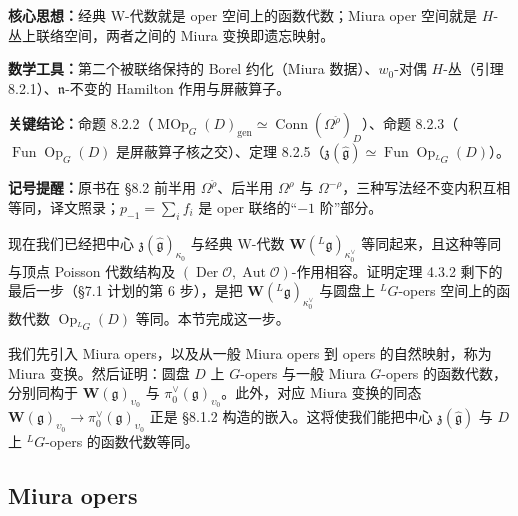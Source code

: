\begin{keypoints}
    \item \textbf{核心思想：}经典 W-代数就是 oper 空间上的函数代数；Miura oper 空间就是 $H$-丛上联络空间，两者之间的 Miura 变换即遗忘映射。
    \item \textbf{数学工具：}第二个被联络保持的 Borel 约化（Miura 数据）、$w_0$-对偶 $H$-丛（引理 8.2.1）、$\mathfrak n$-不变的 Hamilton 作用与屏蔽算子。
    \item \textbf{关键结论：}命题 8.2.2（$\operatorname{MOp}_G(D)_{\mathrm{gen}}\simeq\operatorname{Conn}(\Omega^{\check\rho})_D$）、命题 8.2.3（$\operatorname{Fun}\operatorname{Op}_G(D)$ 是屏蔽算子核之交）、定理 8.2.5（$\mathfrak z(\hat{\mathfrak g})\simeq\operatorname{Fun}\operatorname{Op}_{{}^LG}(D)$）。
    \item \textbf{记号提醒：}原书在 §8.2 前半用 $\Omega^{\check\rho}$、后半用 $\Omega^{\rho}$ 与 $\Omega^{-\rho}$，三种写法经不变内积互相等同，译文照录；$p_{-1}=\sum_i f_i$ 是 oper 联络的“$-1$ 阶”部分。
\end{keypoints}

现在我们已经把中心 $\mathfrak z(\hat{\mathfrak g})_{\kappa_0}$ 与经典 W-代数 $\mathbf W({}^L\mathfrak g)_{\kappa^\vee_0}$ 等同起来，且这种等同与顶点 Poisson 代数结构及 $(\operatorname{Der}\mathcal O,\operatorname{Aut}\mathcal O)$-作用相容。证明定理 4.3.2 剩下的最后一步（§7.1 计划的第 6 步），是把 $\mathbf W({}^L\mathfrak g)_{\kappa^\vee_0}$ 与圆盘上 ${}^LG$-opers 空间上的函数代数 $\operatorname{Op}_{{}^LG}(D)$ 等同。本节完成这一步。

我们先引入 Miura opers，以及从一般 Miura opers 到 opers 的自然映射，称为 Miura 变换。然后证明：圆盘 $D$ 上 $G$-opers 与一般 Miura $G$-opers 的函数代数，分别同构于 $\mathbf W(\mathfrak g)_{\upsilon_0}$ 与 $\pi^\vee_0(\mathfrak g)_{\upsilon_0}$。此外，对应 Miura 变换的同态 $\mathbf W(\mathfrak g)_{\upsilon_0}\to\pi^\vee_0(\mathfrak g)_{\upsilon_0}$ 正是 §8.1.2 构造的嵌入。这将使我们能把中心 $\mathfrak z(\hat{\mathfrak g})$ 与 $D$ 上 ${}^LG$-opers 的函数代数等同。


\subsection{Miura opers}

